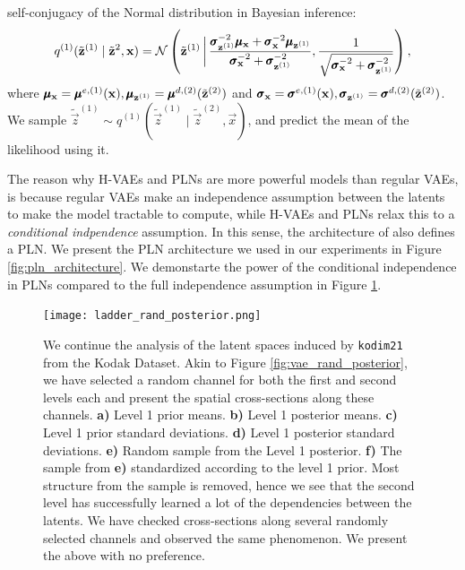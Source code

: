 self-conjugacy of the Normal distribution in Bayesian inference\footnotemark:
\[
  q^{(1)}(\tilde{\mathbf{z}}^{(1)} \mid \tilde{\mathbf{z}}^{2}, \mathbf{x}) =
  \mathcal{N}\left( \tilde{\mathbf{z}}^{(1)} \,\bigg|\,
    \frac{\pmb{\sigma}_{\mathbf{z}^{(1)}}^{-2} \pmb{\mu}_{\mathbf{x}} + \pmb{\sigma}_{\mathbf{x}}^{-2}
      \pmb{\mu}_{\mathbf{z}^{(1)}}}{\pmb{\sigma}_{\mathbf{x}}^{-2} + \pmb{\sigma}_{\mathbf{z}^{(1)}}^{-2}
    },
  \frac{1}{\sqrt{\pmb{\sigma}_{\mathbf{x}}^{-2} + \pmb{\sigma}_{\mathbf{z}^{(1)}}^{-2} }} \right),
\]
where $\pmb{\mu}_{\mathbf{x}} = \pmb{\mu}^{e, (1)}(\mathbf{x}), \pmb{\mu}_{\mathbf{z}^{(1)}} = \pmb{\mu}^{d, (2)}(\tilde{\mathbf{z}}^{(2)})$
and $\pmb{\sigma}_{\mathbf{x}} = \pmb{\sigma}^{e, (1)}(\mathbf{x}), \pmb{\sigma}_{\mathbf{z}^{(1)}} = \pmb{\sigma}^{d, (2)}(\tilde{\mathbf{z}}^{(2)})$.
We sample $\tilde{\vec{z}}^{(1)} \sim q^{(1)}(\tilde{\vec{z}}^{(1)} \mid
\tilde{\vec{z}}^{(2)}, \vec{x})$, and predict the mean of the likelihood using it.
\par 
The reason why H-VAEs and PLNs are more powerful models than regular VAEs, is
because regular VAEs make an independence assumption between the latents to make
the model tractable to compute, while H-VAEs and PLNs relax this to a
\textit{conditional indpendence} assumption. In this sense, the architecture of 
\cite{balle2018variational} also defines a PLN. We present the PLN architecture
we used in our experiments in Figure \ref{fig:pln_architecture}. We demonstarte
the power of the conditional independence in PLNs compared to the full independence
assumption in Figure \ref{fig:ladder_rand_posterior}.


\begin{figure}
  \centering
  \texttt{[image: ladder\_rand\_posterior.png]}
  \caption[Latent spaces induced by \texttt{kodim21} in our PLN]
  {We continue the analysis of the latent spaces induced by
    \texttt{kodim21} from the Kodak Dataset. Akin to Figure
    \ref{fig:vae_rand_posterior}, we have selected a random channel for both the
    first and second levels each and present the spatial cross-sections along these
    channels. \textbf{a)} Level 1 prior means. \textbf{b)} Level 1 posterior means.
    \textbf{c)} Level 1 prior standard deviations. \textbf{d)} Level 1 posterior
    standard deviations. \textbf{e)} Random sample from the Level 1 posterior.
    \textbf{f)} The sample from \textbf{e)} standardized according to the level
    1 prior. Most structure from the sample is removed, hence we see that the
    second level has successfully learned a lot of the dependencies between the
    latents. We have checked cross-sections along several randomly selected
    channels and observed the same phenomenon. We present the above with no preference.}
  \label{fig:ladder_rand_posterior}
\end{figure}

